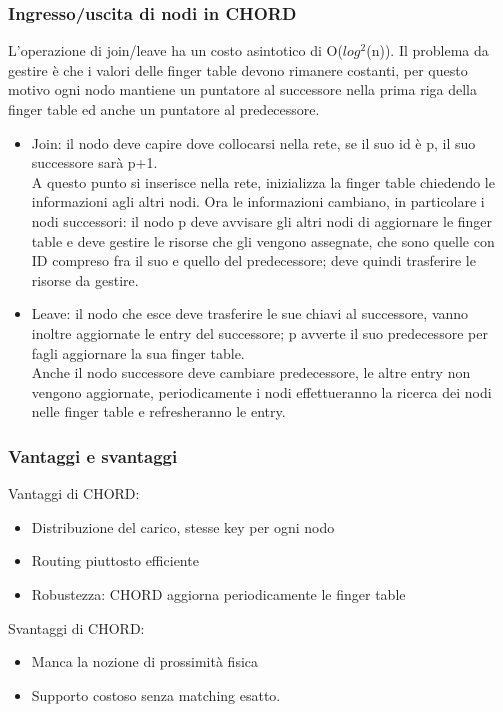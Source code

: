 \documentclass{article}
\begin{document}
\subsubsection{Ingresso/uscita di nodi in CHORD}
L'operazione di join/leave ha un costo asintotico di O($log^2$(n)). Il problema da gestire è che i valori delle finger table devono rimanere costanti, per questo motivo ogni nodo mantiene un puntatore al successore nella prima riga della finger table ed anche un puntatore al predecessore.
\begin{itemize}
\item Join: il nodo deve capire dove collocarsi nella rete, se il suo id è p, il suo successore sarà p+1.\\ A questo punto si inserisce nella rete, inizializza la finger table chiedendo le informazioni agli altri nodi. Ora le informazioni cambiano, in particolare i nodi successori: il nodo p deve avvisare gli altri nodi di aggiornare le finger table e deve gestire le risorse che gli vengono assegnate, che sono quelle con ID compreso fra il suo e quello del predecessore; deve quindi trasferire le risorse da gestire.
\item Leave: il nodo che esce deve trasferire le sue chiavi al successore, vanno inoltre aggiornate le entry del successore; p avverte il suo predecessore per fagli aggiornare la sua finger table.\\ Anche il nodo successore deve cambiare predecessore, le altre entry non vengono aggiornate, periodicamente i nodi effettueranno la ricerca dei nodi nelle finger table e refresheranno le entry.
\end{itemize}
\subsubsection{Vantaggi e svantaggi}
Vantaggi di CHORD:
\begin{itemize}
\item Distribuzione del carico, stesse key per ogni nodo
\item Routing piuttosto efficiente
\item Robustezza: CHORD aggiorna periodicamente le finger table
\end{itemize}
Svantaggi di CHORD:
\begin{itemize}
\item Manca la nozione di prossimità fisica
\item Supporto costoso senza matching esatto.
\end{itemize}
\end{document}
